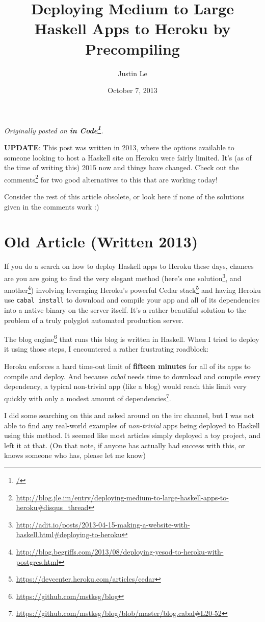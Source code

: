 \documentclass[]{article}
\title{Deploying Medium to Large Haskell Apps to Heroku by Precompiling}
\author{Justin Le}
\date{October 7, 2013}
\renewcommand{\href}[2]{#2\footnote{\url{#1}}}
\begin{document}
\maketitle

\emph{Originally posted on \textbf{\href{/}{in Code}}.}

\textbf{UPDATE}: This post was written in 2013, where the options
available to someone looking to host a Haskell site on Heroku were
fairly limited. It's (as of the time of writing this) 2015 now and
things have changed. Check out
\href{http://blog.jle.im/entry/deploying-medium-to-large-haskell-apps-to-heroku\#disqus_thread}{the
comments} for two good alternatives to this that are working today!

Consider the rest of this article obsolete, or look here if none of the
solutions given in the comments work :)

\section{Old Article (Written 2013)}\label{old-article-written-2013}

If you do a search on how to deploy Haskell apps to Heroku these days,
chances are you are going to find the very elegant method (here's
\href{http://adit.io/posts/2013-04-15-making-a-website-with-haskell.html\#deploying-to-heroku}{one
solution}, and
\href{http://blog.begriffs.com/2013/08/deploying-yesod-to-heroku-with-postgres.html}{another})
involving leveraging Heroku's powerful
\href{https://devcenter.heroku.com/articles/cedar}{Cedar stack} and
having Heroku use \texttt{cabal\ install} to download and compile your
app and all of its dependencies into a native binary on the server
itself. It's a rather beautiful solution to the problem of a truly
polyglot automated production server.

The \href{https://github.com/mstksg/blog}{blog engine} that runs this
blog is written in Haskell. When I tried to deploy it using those steps,
I encountered a rather frustrating roadblock:

Heroku enforces a hard time-out limit of \textbf{fifteen minutes} for
all of its apps to compile and deploy. And because \emph{cabal} needs
time to download and compile every dependency, a typical non-trivial app
(like a blog) would reach this limit very quickly with only a
\href{https://github.com/mstksg/blog/blob/master/blog.cabal\#L20-52}{modest
amount of dependencies}.

I did some searching on this and asked around on the irc channel, but I
was not able to find any real-world examples of \emph{non-trivial} apps
being deployed to Haskell using this method. It seemed like most
articles simply deployed a toy project, and left it at that. (On that
note, if anyone has actually had success with this, or knows someone who
has, please let me know)
\end{document}
